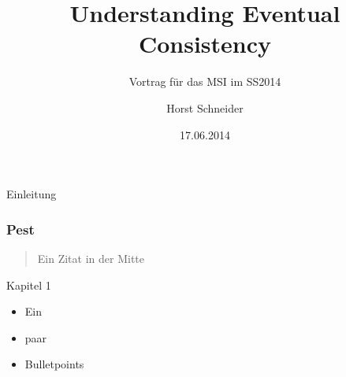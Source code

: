 \documentclass[11pt]{beamer}
\author{Horst Schneider}
\title{Understanding Eventual Consistency}
\subtitle{Vortrag für das MSI im SS2014}
\institute{Hochschule Mannheim}
\date{17.06.2014}
\begin{document}
\begin{frame}
\titlepage
\end{frame}

\begin{frame}
\tableofcontents
\end{frame}

\begin{frame}{Einleitung}
\frametitle{Pest}
\begin{quotation}
\glqq Ein Zitat in der Mitte\grqq
\end{quotation}
\end{frame}

\begin{frame}{Kapitel 1}
\begin{itemize}
\item Ein
\item paar
\item Bulletpoints
\end{itemize}
\end{frame}
\end{document}
